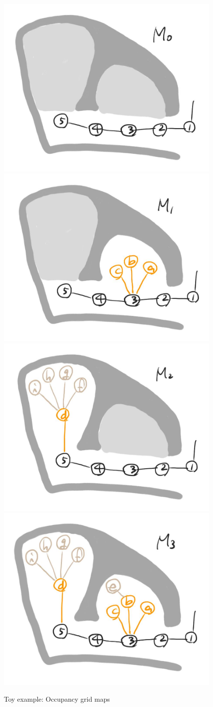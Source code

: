 \documentclass[letterpaper, 10 pt, conference]{ieeeconf}  %
\begin{document}
\begin{figure}[ht!]
  \centering
  \includegraphics[width=.45\columnwidth]{figures/bts_example/bts_map0.png}
  \includegraphics[width=.45\columnwidth]{figures/bts_example/bts_map1.png}
  \includegraphics[width=.45\columnwidth]{figures/bts_example/bts_map2.png}
  \includegraphics[width=.45\columnwidth]{figures/bts_example/bts_map3.png}
  \caption{Toy example: Occupancy grid maps}
  \label{fig:bts_maps}
\end{figure}
\end{document}
